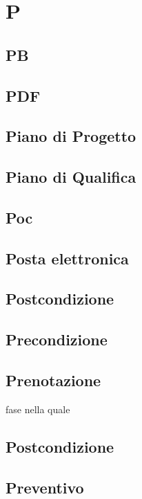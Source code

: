 \section{P} 
\subsection{PB} 

\subsection{PDF} 

\subsection{Piano di Progetto} 

\subsection{Piano di Qualifica} 

\subsection{Poc} 

\subsection{Posta elettronica} 

\subsection{Postcondizione} 

\subsection{Precondizione} 

\subsection{Prenotazione} 
fase nella quale
\subsection{Postcondizione} 

\subsection{Preventivo} 

